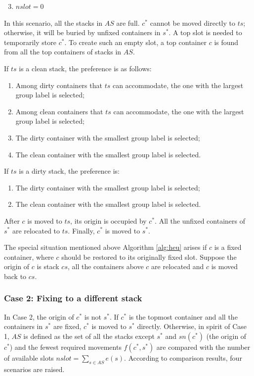 \documentclass[review,3p,times,authoryear,12pt]{elsarticle}
\begin{document}
\begin{enumerate}
\setcounter{enumi}{2}
\item $\mathit{nslot}=0$
\end{enumerate}

In this scenario, all the stacks in $\mathit{AS}$ are full.
$c^*$ cannot be moved directly to $\mathit{ts}$; otherwise, it will be buried by unfixed containers in $s^*$.
A top slot is needed to temporarily store $c^*$.
To create such an empty slot, a top container $c$ is found from all the top containers of stacks in $\mathit{AS}$.

If $\mathit{ts}$ is a clean stack, the preference is as follows:
\begin{enumerate}[1.]
\item Among dirty containers that $\mathit{ts}$ can accommodate, the one with the largest group label is selected;
\item Among clean containers that $\mathit{ts}$ can accommodate, the one with the largest group label is selected;
\item The dirty container with the smallest group label is selected;
\item The clean container with the smallest group label is selected.
\end{enumerate}

If $\mathit{ts}$ is a dirty stack, the preference is:
\begin{enumerate}[1.]
\item The dirty container with the smallest group label is selected;
\item The clean container with the smallest group label is selected.
\end{enumerate}

After $c$ is moved to $\mathit{ts}$, its origin is occupied by $c^*$.
All the unfixed containers of $s^*$ are relocated to $\mathit{ts}$.
Finally, $c^*$ is moved to $s^*$.

The special situation mentioned above Algorithm \ref{alg:heu} arises if $c$ is a fixed container, where $c$ should be restored to its originally fixed slot.
Suppose the origin of $c$ is stack $\mathit{cs}$, all the containers above $c$ are relocated and $c$ is moved back to $\mathit{cs}$.

\subsubsection{Case 2: Fixing to a different stack}

In Case 2, the origin of $c^*$ is not $s^*$.
If $c^*$ is the topmost container and all the containers in $s^*$ are fixed, $c^*$ is moved to $s^*$ directly.
Otherwise, in spirit of Case 1, $\mathit{AS}$ is defined as the set of all the stacks except $s^*$ and $\mathit{sn}(c^*)$ (the origin of $c^*$) and the fewest required movements $f(c^*,s^*)$ are compared with the number of available slots $\mathit{nslot}=\sum_{s\in \mathit{AS}}e(s)$.
According to comparison results, four scenarios are raised.
\end{document}
